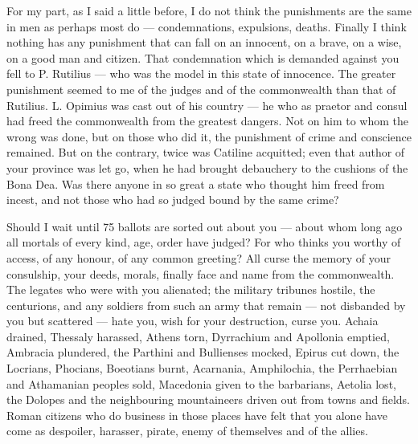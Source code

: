  For my part, as I said a little before, I do not think the punishments are the same in men as perhaps most do — condemnations, expulsions, deaths. Finally I think nothing has any punishment that can fall on an innocent, on a brave, on a wise, on a good man and citizen. That condemnation which is demanded against you fell to P. Rutilius — who was the model in this state of innocence. The greater punishment seemed to me of the judges and of the commonwealth than that of Rutilius. L. Opimius was cast out of his country — he who as praetor and consul had freed the commonwealth from the greatest dangers. Not on him to whom the wrong was done, but on those who did it, the punishment of crime and conscience remained. But on the contrary, twice was Catiline acquitted; even that author of your province was let go, when he had brought debauchery to the cushions of the Bona Dea. Was there anyone in so great a state who thought him freed from incest, and not those who had so judged bound by the same crime?

 Should I wait until 75 ballots are sorted out about you — about whom long ago all mortals of every kind, age, order have judged? For who thinks you worthy of access, of any honour, of any common greeting? All curse the memory of your consulship, your deeds, morals, finally face and name from the commonwealth. The legates who were with you alienated; the military tribunes hostile, the centurions, and any soldiers from such an army that remain — not disbanded by you but scattered — hate you, wish for your destruction, curse you. Achaia drained, Thessaly harassed, Athens torn, Dyrrachium and Apollonia emptied, Ambracia plundered, the Parthini and Bullienses mocked, Epirus cut down, the Locrians, Phocians, Boeotians burnt, Acarnania, Amphilochia, the Perrhaebian and Athamanian peoples sold, Macedonia given to the barbarians, Aetolia lost, the Dolopes and the neighbouring mountaineers driven out from towns and fields. Roman citizens who do business in those places have felt that you alone have come as despoiler, harasser, pirate, enemy of themselves and of the allies.

